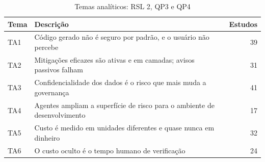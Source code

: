 \begin{table}[htbp]
\centering
\caption{Temas analíticos: RSL 2, QP3 e QP4}
\label{tab:temas-B3}
\small
\begin{tabular}{lp{11cm}r}
\hline
\textbf{Tema} & \textbf{Descrição} & \textbf{Estudos} \\
\hline
TA1 & Código gerado não é seguro por padrão, e o usuário não percebe & 39 \\
TA2 & Mitigações eficazes são ativas e em camadas; avisos passivos falham & 31 \\
TA3 & Confidencialidade dos dados é o risco que mais muda a governança & 41 \\
TA4 & Agentes ampliam a superfície de risco para o ambiente de desenvolvimento & 17 \\
TA5 & Custo é medido em unidades diferentes e quase nunca em dinheiro & 32 \\
TA6 & O custo oculto é o tempo humano de verificação & 24 \\
\hline
\end{tabular}
\end{table}

